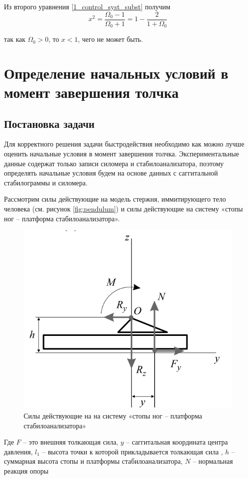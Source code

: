 \documentclass[a4paper,12pt, openany]{book}
\theoremstyle{plain} %
\theoremstyle{definition} %
\theoremstyle{remark} %
\numberwithin{equation}{chapter}
\begin{document}
{Из второго уравнения \eqref{1_control_syst_subst} получим
$$x^2=\dfrac{\Omega_0-1}{\Omega_0+1}=1-\dfrac{2}{1+\Omega_0}$$

так как $\Omega_0>0$, то $x<1$, чего не может быть.
\chapter{Определение начальных условий в момент завершения толчка}
\section{Постановка задачи}
Для корректного решения задачи быстродействия необходимо как можно лучше оценить
начальные условия в момент завершения толчка. Экспериментальные данные содержат только записи силомера
и стабилоанализатора, поэтому определять начальные условия будем на основе данных с саггитальной стабилограммы и силомера.

Рассмотрим силы действующие на модель стержня, иммитирующего тело человека (см. рисунок \ref{fig:pendulum})
и силы действующие на систему «стопы ног – платформа стабилоанализатора».
\begin{figure}[h!]
    \centering
    \includegraphics[width=0.5\linewidth]{foot.png}
    \caption{Силы действующие на на систему «стопы ног – платформа стабилоанализатора» }
    \label{fig:foot-platform}
\end{figure}

Где $F$ – это внешняя толкающая сила, $y$ – саггитальная координата центра давления, $l_1$ – высота точки к которой прикладывается толкающая сила
, $h$ – суммарная высота стопы и платформы стабилоанализатора, $N$ – нормальная реакция опоры

}
\end{document}
